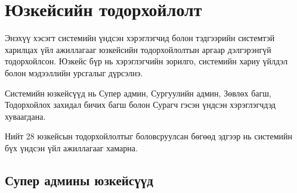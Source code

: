 \section{Юзкейсийн тодорхойлолт}

Энэхүү хэсэгт системийн үндсэн хэрэглэгчид болон
тэдгээрийн системтэй харилцах үйл ажиллагааг
юзкейсийн тодорхойлолтын аргаар дэлгэрэнгүй
тодорхойлсон. Юзкейс бүр нь хэрэглэгчийн зорилго,
системийн хариу үйлдэл болон мэдээллийн урсгалыг
дүрсэлнэ.

Системийн юзкейсүүд нь Супер админ, Сургуулийн
админ, Зөвлөх багш, Тодорхойлох захидал бичих
багш болон Сурагч гэсэн үндсэн хэрэглэгчдэд
хуваагдана.

Нийт 28 юзкейсын тодорхойлолтыг боловсруулсан
бөгөөд эдгээр нь системийн бүх үндсэн үйл
ажиллагааг хамарна.

\subsection*{Супер админы юзкейсүүд}


